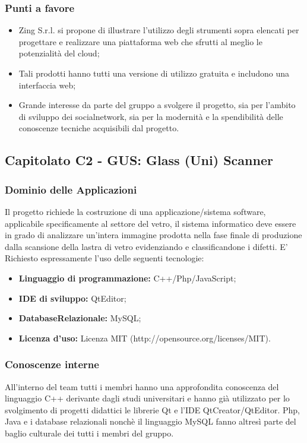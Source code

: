   \subsubsection{Punti a favore}
  \begin{itemize}
     \item Zing S.r.l. si propone di illustrare l’utilizzo degli strumenti sopra elencati per progettare e realizzare una piattaforma web che sfrutti al meglio le potenzialità del cloud;
     \item Tali prodotti hanno tutti una versione di utilizzo gratuita e includono una interfaccia web;
     \item Grande interesse da parte del gruppo a svolgere il progetto, sia per l'ambito di sviluppo dei socialnetwork, sia per la modernità e la spendibilità delle conoscenze tecniche acquisibili dal progetto.
  \end{itemize}
\subsection{Capitolato C2 - GUS: Glass (Uni) Scanner}
  \subsubsection{Dominio delle Applicazioni}
  Il progetto richiede la costruzione di una applicazione/sistema software, applicabile specificamente al settore del vetro, il  sistema  informatico deve essere in grado di analizzare un'intera immagine prodotta nella fase finale di produzione dalla scansione della lastra di vetro evidenziando e classificandone i difetti. E' Richiesto espressamente l'uso delle seguenti tecnologie:
  \begin{itemize}
  	\item \textbf{Linguaggio  di  programmazione:} C++/Php/JavaScript;
  	\item \textbf{IDE di sviluppo:} QtEditor;
  	\item \textbf{DatabaseRelazionale:} MySQL;
  	\item \textbf{Licenza d'uso:} Licenza MIT (http://opensource.org/licenses/MIT).
  \end{itemize}
  \subsubsection{Conoscenze interne}
  All'interno del team tutti i membri hanno una approfondita conoscenza del linguaggio C++ derivante dagli studi universitari e hanno già utilizzato per lo svolgimento di progetti didattici le librerie Qt e l'IDE QtCreator/QtEditor. Php, Java e i database relazionali nonchè il linguaggio MySQL fanno altresì parte del baglio culturale dei tutti i membri del gruppo.
